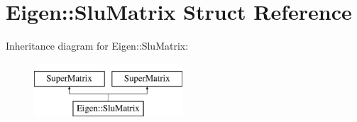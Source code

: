 \hypertarget{struct_eigen_1_1_slu_matrix}{}\section{Eigen\+:\+:Slu\+Matrix Struct Reference}
\label{struct_eigen_1_1_slu_matrix}
Inheritance diagram for Eigen\+:\+:Slu\+Matrix\+:\begin{figure}[H]
\begin{center}
\leavevmode
\includegraphics[height=2.000000cm]{struct_eigen_1_1_slu_matrix}
\end{center}
\end{figure}

